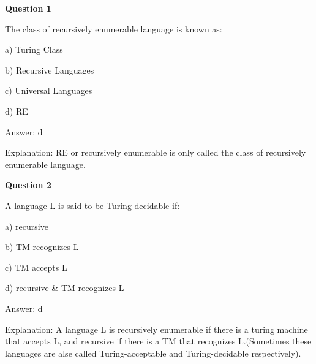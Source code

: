 \documentclass{article}
\begin{document}
\begin{mdframed}[linewidth=1pt, roundcorner=5pt, linecolor=gray!30, backgroundcolor=gray!5]
\textbf{Question 1} 

The class of recursively enumerable language is known as:

a) Turing Class

b) Recursive Languages

c) Universal Languages

d) RE
\vspace{5pt} \par
\begin{tcolorbox}[colback=green!5, colframe=green!40!black, title=Solution]
Answer: d

Explanation: RE or recursively enumerable is only called the class of recursively enumerable language.
\end{tcolorbox}
\end{mdframed}

\begin{mdframed}[linewidth=1pt, roundcorner=5pt, linecolor=gray!30, backgroundcolor=gray!5]
\textbf{Question 2} 

A language L is said to be Turing decidable if:

a) recursive

b) TM recognizes L

c) TM accepts L

d) recursive \& TM recognizes L
\vspace{5pt} \par
\begin{tcolorbox}[colback=green!5, colframe=green!40!black, title=Solution]
Answer: d

Explanation: A language L is recursively enumerable if there is a turing machine that accepts L, and recursive if there is a TM that recognizes L.(Sometimes these languages are alse called Turing-acceptable and Turing-decidable respectively).
\end{tcolorbox}
\end{mdframed}
\end{document}
